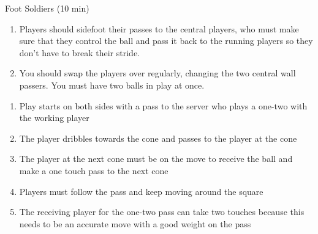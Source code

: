 \begin{evenBlock}{Foot Soldiers (10 min)}
\begin{minipage}[t]{\linewidth}
\begin{minipage}{.5\linewidth}
\begin{enumerate}
        \item Players should sidefoot their passes to the central players, who must make sure that they control the ball and pass it back to the running players so they don’t have to break their stride.
        \item You should swap the players over regularly, changing the two central wall passers. You must have two balls in play at once.
        \end{enumerate}

        \begin{enumerate}
        \setlength{\itemsep}{0pt}
        \setlength{\parskip}{0pt}
        \setlength{\parsep}{0pt}
        \item Play starts on both sides with a pass to the server who plays a one-two with the working player
        \item The player dribbles towards the cone and passes to the player at the cone
        \item The player at the next cone must be on the move to receive the ball and make a one touch pass to the next cone
        \item Players must follow the pass and keep moving around the square
        \item The receiving player for the one-two pass can take two touches because this needs to be an accurate move with a good weight on the pass
        \end{enumerate}

    \end{minipage}
\end{minipage}

\end{evenBlock}